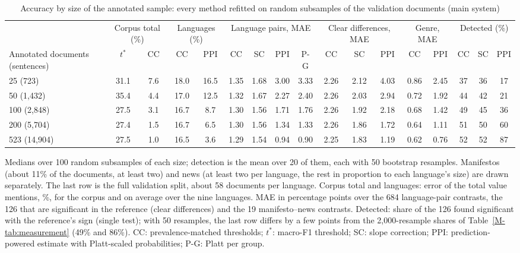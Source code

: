 \begin{table}[t]
\caption{Accuracy by size of the annotated sample: every method refitted on random subsamples of the validation documents (main system)}
\label{tab:subsample}
\centering
\scriptsize
\setlength{\tabcolsep}{3pt}
\begin{tabular*}{\textwidth}{@{\extracolsep{\fill}}lcccccccccccccccc@{}}
\toprule
 & \multicolumn{2}{c}{Corpus total (\%)} & \multicolumn{2}{c}{Languages (\%)} & \multicolumn{4}{c}{Language pairs, MAE} & \multicolumn{3}{c}{Clear differences, MAE} & \multicolumn{2}{c}{Genre, MAE} & \multicolumn{3}{c}{Detected (\%)} \\
\cmidrule(lr){2-3}\cmidrule(lr){4-5}\cmidrule(lr){6-9}\cmidrule(lr){10-12}\cmidrule(lr){13-14}\cmidrule(lr){15-17}
Annotated documents (sentences) & $t^*$ & CC & CC & PPI & CC & SC & PPI & P-G & CC & SC & PPI & CC & PPI & CC & SC & PPI \\
\midrule
25 (723) & 31.1 & 7.6 & 18.0 & 16.5 & 1.35 & 1.68 & 3.00 & 3.33 & 2.26 & 2.12 & 4.03 & 0.86 & 2.45 & 37 & 36 & 17 \\
50 (1,432) & 35.4 & 4.4 & 17.0 & 12.5 & 1.32 & 1.67 & 2.27 & 2.40 & 2.26 & 2.03 & 2.94 & 0.72 & 1.92 & 44 & 42 & 21 \\
100 (2,848) & 27.5 & 3.1 & 16.7 & 8.7 & 1.30 & 1.56 & 1.71 & 1.76 & 2.26 & 1.92 & 2.18 & 0.68 & 1.42 & 49 & 45 & 36 \\
200 (5,704) & 27.4 & 1.5 & 16.7 & 6.5 & 1.30 & 1.56 & 1.34 & 1.33 & 2.26 & 1.86 & 1.72 & 0.64 & 1.11 & 51 & 50 & 60 \\
523 (14,904) & 27.5 & 1.0 & 16.5 & 3.6 & 1.29 & 1.54 & 0.94 & 0.90 & 2.25 & 1.83 & 1.19 & 0.62 & 0.76 & 52 & 52 & 87 \\
\bottomrule
\end{tabular*}
\par\vspace{2pt}
\begin{minipage}{\textwidth}\scriptsize Medians over 100 random subsamples of each size; detection is the mean over 20 of them, each with 50 bootstrap resamples. Manifestos (about 11\% of the documents, at least two) and news (at least two per language, the rest in proportion to each language's size) are drawn separately. The last row is the full validation split, about 58 documents per language. Corpus total and languages: error of the total value mentions, \%, for the corpus and on average over the nine languages. MAE in percentage points over the 684 language-pair contrasts, the 126 that are significant in the reference (clear differences) and the 19 manifesto--news contrasts. Detected: share of the 126 found significant with the reference's sign (single test); with 50 resamples, the last row differs by a few points from the 2,000-resample shares of Table~\ref{M-tab:measurement} (49\% and 86\%). CC: prevalence-matched thresholds; $t^*$: macro-F1 threshold; SC: slope correction; PPI: prediction-powered estimate with Platt-scaled probabilities; P-G: Platt per group.\end{minipage}
\end{table}
